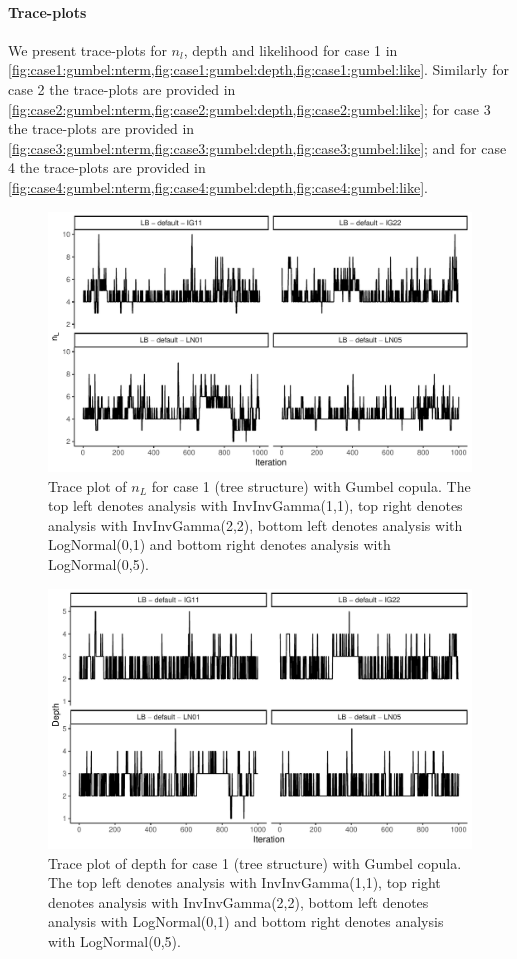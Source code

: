 \documentclass{amsart}
\begin{document}
\paragraph{Trace-plots} We present trace-plots for $n_l$, depth and likelihood for case 1 in \cref{fig:case1:gumbel:nterm,fig:case1:gumbel:depth,fig:case1:gumbel:like}. Similarly for case 2 the trace-plots are provided in \cref{fig:case2:gumbel:nterm,fig:case2:gumbel:depth,fig:case2:gumbel:like}; for case 3 the trace-plots are provided in \cref{fig:case3:gumbel:nterm,fig:case3:gumbel:depth,fig:case3:gumbel:like}; and for case 4 the trace-plots are provided in \cref{fig:case4:gumbel:nterm,fig:case4:gumbel:depth,fig:case4:gumbel:like}.


\begin{figure}
	\centering
	\includegraphics[width = 0.75\linewidth]{trace_case1_gumbel_nterm.pdf}
	\caption{Trace plot of $n_L$ for case 1 (tree structure) with Gumbel copula. The top left denotes analysis with InvInvGamma(1,1), top right denotes analysis with InvInvGamma(2,2), bottom left denotes analysis with LogNormal(0,1) and bottom right denotes analysis with LogNormal(0,5).}
	\label{fig:case1:gumbel:nterm}
\end{figure}

\begin{figure}
	\centering
	\includegraphics[width = 0.75\linewidth]{trace_case1_gumbel_depth.pdf}
	\caption{Trace plot of depth for case 1 (tree structure) with Gumbel copula. The top left denotes analysis with InvInvGamma(1,1), top right denotes analysis with InvInvGamma(2,2), bottom left denotes analysis with LogNormal(0,1) and bottom right denotes analysis with LogNormal(0,5).}
	\label{fig:case1:gumbel:depth}
\end{figure}
\end{document}
